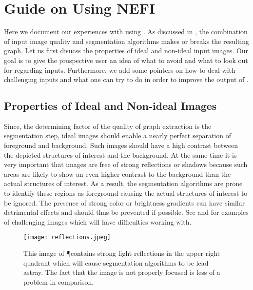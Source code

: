 
\chapter{Guide on Using NEFI}\label{app:nefi}

	Here we document our experiences with using \NEFI. As discussed in , the combination of input image quality and \NEFIs segmentation algorithms makes or breaks the resulting graph. Let us first disucss the properties of ideal and non-ideal input images. Our goal is to give the prospective user an idea of what to avoid and what to look out for regarding inputs. Furthermore, we add some pointers on how to deal with challenging inputs and what one can try to do in order to improve the output of \NEFI. 

\section{Properties of Ideal and Non-ideal Images}

	Since, the determining factor of the quality of \NEFIs graph extraction is the segmentation step, ideal images should enable a nearly perfect separation of foreground and background. Such images should have a high contrast between the depicted structures of interest and the background. At the same time it is very important that images are free of strong reflections or shadows because such areas are likely to show an even higher contrast to the background than the actual structures of interest. As a result, the segmentation algorithms are prone to identify these regions as foreground causing the actual structures of interest to be ignored. The presence of strong color or brightness gradients can have similar detrimental effects and should thus be prevented if possible. See  and  for examples of challenging images which \NEFI will have difficulties working with.

	\begin{figure}
		\centering
		\texttt{[image: reflections.jpeg]}
		\caption[\NEFIs caveats - Reflections]{This image of \P contains strong light reflections in the upper right quadrant which will cause \NEFIs segmentation algorithms to be lead astray. The fact that the image is not properly focused is less of a problem in comparison.}
		\label{fig:sup:reflection}
	\end{figure}

